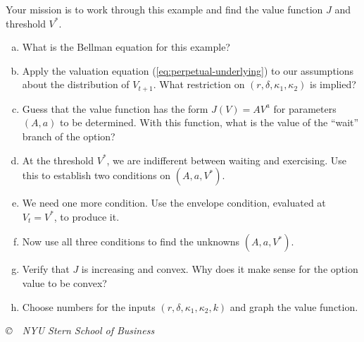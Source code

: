 \documentclass[11pt]{exam}
\begin{document}
Your mission is to work through this example and find the value function $J$ 
and threshold $V^*$.  
%
\begin{enumerate}[(a)]
\item What is the Bellman equation for this example? 

\item Apply the valuation equation (\ref{eq:perpetual-underlying}) to our assumptions
about the distribution of $V_{t+1}$.  
What restriction on $(r,\delta,\kappa_1,\kappa_2)$ is implied?  

\item Guess that the value function has the form 
$J(V) = A V^a$ for parameters $(A,a)$ to be determined. 
With this function, what is the value of the ``wait'' branch of the option?  

\item At the threshold $V^*$, we are indifferent between waiting and exercising.
Use this to establish two conditions on $(A,a,V^*)$.  

\item We need one more condition.  Use the envelope condition, 
evaluated at $V_t = V^*$, to produce it.

\item Now use all three conditions to find the unknowns 
$(A,a,V^*)$.  

\item Verify that $J$ is increasing and convex.   
Why does it make sense for the option value to be convex?  

\item Choose numbers for the inputs $(r,\delta,\kappa_1,\kappa_2, k)$ and
graph the value function.  


\end{enumerate}


\vfill \centerline{\it \copyright \ \number\year \
NYU Stern School of Business}
\end{document}
